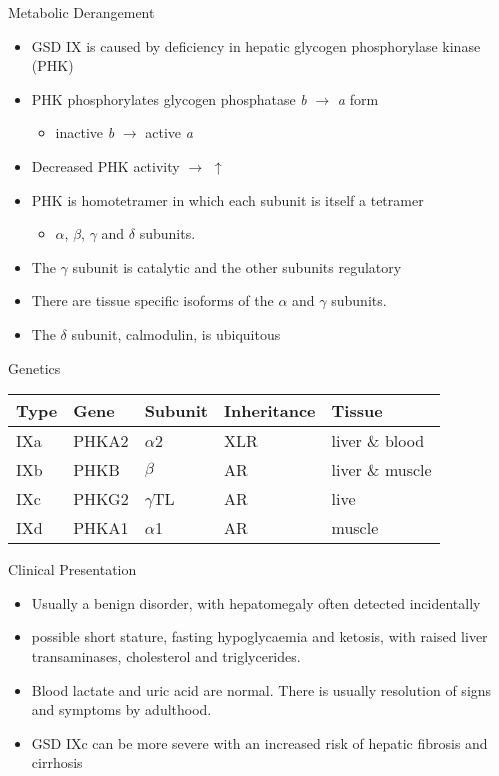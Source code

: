 \documentclass[presentation, smaller]{beamer}
\begin{document}
\begin{frame}[label={sec:org3dac432}]{Metabolic Derangement}
\begin{itemize}
\item GSD IX is caused by deficiency in hepatic glycogen phosphorylase kinase (PHK)
\item PHK phosphorylates glycogen phosphatase \emph{b} \(\to\) \emph{a} form
\begin{itemize}
\item inactive \emph{b} \(\to\)  active \emph{a}
\end{itemize}
\item Decreased PHK activity \(\to\) \(\uparrow\)
\item PHK is homotetramer in which each subunit is itself a tetramer
\begin{itemize}
\item \(\alpha\), \(\beta\), \(\gamma\) and \(\delta\) subunits.
\end{itemize}
\item The \(\gamma\) subunit is catalytic and the other subunits regulatory
\item There are tissue specific isoforms of the \(\alpha\) and \(\gamma\) subunits.
\item The \(\delta\) subunit, calmodulin, is ubiquitous
\end{itemize}
\end{frame}

\begin{frame}[label={sec:orgf15e38b}]{Genetics}
\begin{center}
\begin{tabular}{lllll}
Type & Gene & Subunit & Inheritance & Tissue\\
\hline
IXa & PHKA2 & \(\alpha\)2 & XLR & liver \& blood\\
IXb & PHKB & \(\beta\) & AR & liver \& muscle\\
IXc & PHKG2 & \(\gamma\)TL & AR & live\\
IXd & PHKA1 & \(\alpha\)1 & AR & muscle\\
\end{tabular}
\end{center}
\end{frame}

\begin{frame}[label={sec:orgd034f25}]{Clinical Presentation}
\begin{itemize}
\item Usually a benign disorder, with hepatomegaly often detected
incidentally
\item possible short stature, fasting hypoglycaemia and ketosis, with
raised liver transaminases, cholesterol and triglycerides.
\item Blood lactate and uric acid are normal. There is usually resolution
of signs and symptoms by adulthood.
\item GSD IXc can be more severe with an increased risk of hepatic fibrosis and cirrhosis
\end{itemize}
\end{frame}
\end{document}
